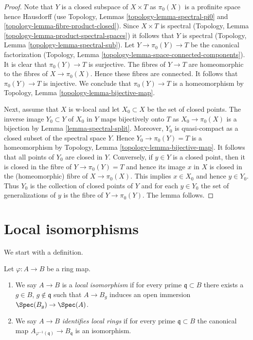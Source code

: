 \begin{proof}
Note that $Y$ is a closed subspace of $X \times T$ as $\pi_0(X)$
is a profinite space hence Hausdorff
(use Topology, Lemmas \ref{topology-lemma-spectral-pi0} and
\ref{topology-lemma-fibre-product-closed}).
Since $X \times T$ is spectral
(Topology, Lemma \ref{topology-lemma-product-spectral-spaces})
it follows that $Y$ is spectral
(Topology, Lemma \ref{topology-lemma-spectral-sub}).
Let $Y \to \pi_0(Y) \to T$ be the canonical factorization
(Topology, Lemma \ref{topology-lemma-space-connected-components}).
It is clear that $\pi_0(Y) \to T$ is surjective.
The fibres of $Y \to T$ are homeomorphic to the fibres of
$X \to \pi_0(X)$. Hence these fibres are connected. It follows
that $\pi_0(Y) \to T$ is injective. We conclude that $\pi_0(Y) \to T$
is a homeomorphism by
Topology, Lemma \ref{topology-lemma-bijective-map}.

\medskip\noindent
Next, assume that $X$ is w-local and let $X_0 \subset X$ be the
set of closed points. The inverse image $Y_0 \subset Y$ of $X_0$ in
$Y$ maps bijectively onto $T$ as $X_0 \to \pi_0(X)$ is a bijection
by Lemma \ref{lemma-spectral-split}. Moreover, $Y_0$ is quasi-compact
as a closed subset of the spectral space $Y$. Hence
$Y_0 \to \pi_0(Y) = T$ is a homeomorphism by
Topology, Lemma \ref{topology-lemma-bijective-map}.
It follows that all points of $Y_0$ are closed in $Y$.
Conversely, if $y \in Y$ is a closed point, then
it is closed in the fibre of $Y \to \pi_0(Y) = T$
and hence its image $x$ in $X$ is closed in the (homeomorphic) fibre of
$X \to \pi_0(X)$. This implies $x \in X_0$ and hence $y \in Y_0$.
Thus $Y_0$ is the collection of closed points of $Y$
and for each $y \in Y_0$ the set of generalizations of $y$ is
the fibre of $Y \to \pi_0(Y)$. The lemma follows.
\end{proof}




\section{Local isomorphisms}
\label{section-local-isomorphism}

\noindent
We start with a definition.

\begin{definition}
\label{definition-local-isomorphism}
Let $\varphi : A \to B$ be a ring map.
\begin{enumerate}
\item We say $A \to B$ is a {\it local isomorphism} if for every prime
$\mathfrak q \subset B$ there exists a $g \in B$, $g \not \in \mathfrak q$
such that $A \to B_g$ induces an open immersion $\Spec(B_g) \to \Spec(A)$.
\item We say $A \to B$ {\it identifies local rings} if for every prime
$\mathfrak q \subset B$ the canonical map
$A_{\varphi^{-1}(\mathfrak q)} \to B_\mathfrak q$ is an isomorphism.
\end{enumerate}
\end{definition}

